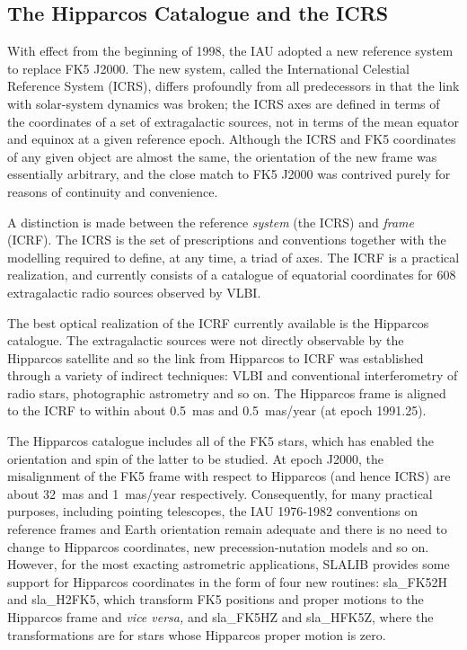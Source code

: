 \documentclass[11pt,twoside]{article}
\begin{document}
\subsection{The Hipparcos Catalogue and the ICRS}
With effect from the beginning of 1998, the IAU adopted a new
reference system to replace FK5 J2000.  The new system, called the
International Celestial Reference System (ICRS), differs profoundly
from all predecessors in that the link with solar-system dynamics
was broken;  the ICRS axes are defined in terms of the coordinates
of a set of extragalactic sources, not in terms of the mean equator and
equinox at a given reference epoch.  Although the ICRS and FK5 coordinates
of any given object are almost the same, the orientation of the new frame
was essentially arbitrary, and the close match to FK5 J2000 was contrived
purely for reasons of continuity and convenience.

A distinction is made between the reference {\it system}\/ (the ICRS)
and {\it frame}\/ (ICRF).  The ICRS is the set of prescriptions and
conventions together with the modelling required to define, at any
time, a triad of axes.  The ICRF is a practical realization, and
currently consists of a catalogue of equatorial coordinates for 608
extragalactic radio sources observed by VLBI.

The best optical realization of the ICRF currently available is the
Hipparcos catalogue.  The extragalactic sources were not directly
observable by the Hipparcos satellite and so the link from Hipparcos
to ICRF was established through a variety of indirect techniques: VLBI and
conventional interferometry of radio stars, photographic astrometry
and so on.  The Hipparcos frame is aligned to the ICRF to within about
0.5~mas and 0.5~mas/year (at epoch 1991.25).

The Hipparcos catalogue includes all of the FK5 stars, which has enabled
the orientation and spin of the latter to be studied.  At epoch J2000,
the misalignment of the FK5 frame with respect to Hipparcos
(and hence ICRS) are about 32~mas and 1~mas/year respectively.
Consequently, for many practical purposes, including pointing
telescopes, the IAU 1976-1982 conventions on reference frames and
Earth orientation remain adequate and there is no need to change to
Hipparcos coordinates, new precession-nutation models and so on.
However, for the most exacting astrometric applications, SLALIB
provides some support for Hipparcos coordinates in the form of
four new routines:
sla\_FK52H and
sla\_H2FK5,
which transform FK5 positions and proper motions to the Hipparcos frame
and {\it vice versa,}\/ and
sla\_FK5HZ and
sla\_HFK5Z,
where the transformations are for stars whose Hipparcos proper motion is
zero.
\end{document}
